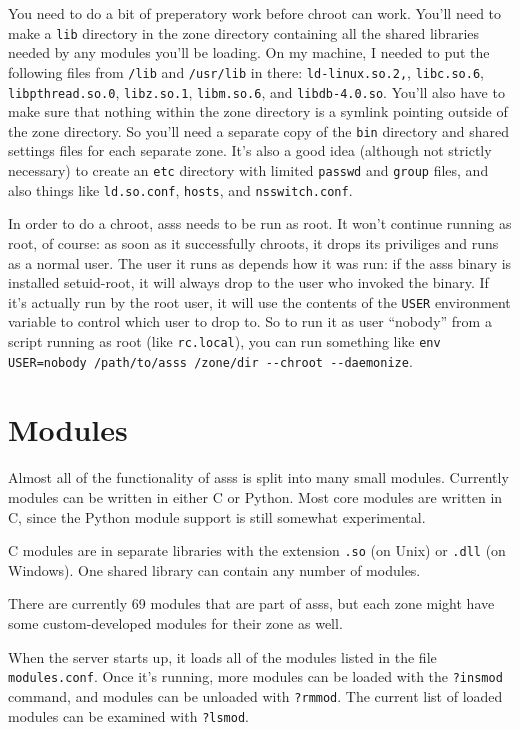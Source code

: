 \documentclass{article}
\newcommand{\asss}{asss}
\begin{document}
You need to do a bit of preperatory work before chroot can work. You'll
need to make a \verb/lib/ directory in the zone directory containing all
the shared libraries needed by any modules you'll be loading. On my
machine, I needed to put the following files from \verb+/lib+ and
\verb+/usr/lib+ in there:
\verb/ld-linux.so.2,/,
\verb/libc.so.6/,
\verb/libpthread.so.0/,
\verb/libz.so.1/,
\verb/libm.so.6/, and
\verb/libdb-4.0.so/.
You'll also have to make sure that nothing within the zone directory is
a symlink pointing outside of the zone directory. So you'll need a
separate copy of the \verb/bin/ directory and shared settings files for
each separate zone. It's also a good idea (although not strictly
necessary) to create an \verb/etc/ directory with limited \verb/passwd/
and \verb/group/ files, and also things like \verb/ld.so.conf/,
\verb/hosts/, and \verb/nsswitch.conf/.

In order to do a chroot, \asss{} needs to be run as root. It won't
continue running as root, of course: as soon as it successfully chroots,
it drops its priviliges and runs as a normal user. The user it runs as
depends how it was run: if the \asss{} binary is installed setuid-root,
it will always drop to the user who invoked the binary. If it's actually
run by the root user, it will use the contents of the \verb/USER/
environment variable to control which user to drop to. So to run it as
user ``nobody'' from a script running as root (like \verb/rc.local/),
you can run something like
\verb|env USER=nobody /path/to/asss /zone/dir --chroot --daemonize|.


\section{Modules}

Almost all of the functionality of \asss{} is split into many small
modules. Currently modules can be written in either C or Python. Most
core modules are written in C, since the Python module support is still
somewhat experimental.

C modules are in separate libraries with the extension \verb/.so/ (on
Unix) or \verb/.dll/ (on Windows). One shared library can contain any
number of modules.

There are currently
69
modules that are part of \asss{}, but each zone might have some
custom-developed modules for their zone as well.

When the server starts up, it loads all of the modules listed in the
file \verb/modules.conf/. Once it's running, more modules can be loaded
with the \verb/?insmod/ command, and modules can be unloaded with
\verb/?rmmod/. The current list of loaded modules can be examined with
\verb/?lsmod/.
\end{document}
